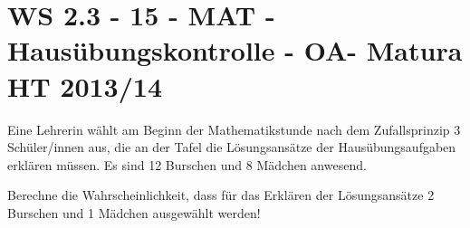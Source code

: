 \section{WS 2.3 - 15 - MAT - Hausübungskontrolle - OA- Matura HT 2013/14}

\begin{beispiel}[WS 2.3]{1} %
				Eine Lehrerin wählt am Beginn der Mathematikstunde nach dem Zufallsprinzip 3 Schüler/innen aus, die an der Tafel die Lösungsansätze der Hausübungsaufgaben erklären müssen. Es sind 12 Burschen und 8 Mädchen anwesend. 
				
Berechne die Wahrscheinlichkeit, dass für das Erklären der Lösungsansätze 2 Burschen und 1 Mädchen ausgewählt werden!\leer


\end{beispiel}